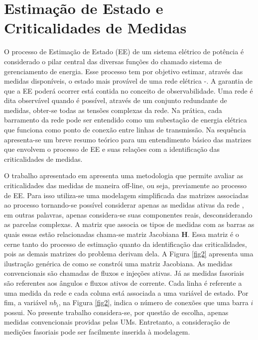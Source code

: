 \documentclass[12pt]{article}
\begin{document}
\section{Estimação de Estado e Criticalidades de Medidas}

O processo de Estimação de Estado (EE) de um sistema elétrico de potência é considerado o pilar central das diversas funções do chamado sistema de gerenciamento de energia. Esse processo tem por objetivo estimar, através das medidas disponíveis, o estado mais provável de uma rede elétrica \cite{Abur04}-\cite{Mont99}. A garantia de que a EE poderá ocorrer está contida no conceito de observabilidade. Uma rede é dita observável quando é possível, através de um conjunto redundante de medidas, obter-se todas as tensões complexas da rede. Na prática, cada barramento da rede pode ser entendido como um subestação de energia elétrica que funciona como ponto de conexão entre linhas de transmissão. Na sequência apresenta-se um breve resumo teórico para um entendimento básico das matrizes que envolvem o processo de EE e suas relações com a identificação das criticalidades de medidas.

O trabalho apresentado em \cite{Hand07} apresenta uma metodologia que permite avaliar as criticalidades das medidas de maneira off-line, ou seja, previamente ao processo de EE. Para isso utiliza-se uma modelagem simplificada das matrizes associadas ao processo tornando-se possível considerar apenas as medidas ativas da rede \cite{Abur04}, em outras palavras, apenas considera-se suas componentes reais, desconsiderando as parcelas complexas. A matriz que associa os tipos de medidas com as barras as quais essas estão relacionadas chama-se matriz Jacobiana $\mathbf{H}$. Essa matriz é o cerne tanto do processo de estimação quanto da identificação das criticalidades, pois as  demais matrizes do problema derivam dela. A Figura \ref{fig2} apresenta uma ilustração genérica de como se constrói uma matriz Jacobiana. As medidas convencionais são chamadas de fluxos e injeções ativas. Já as medidas fasoriais são referentes aos ângulos e fluxos ativos de corrente. Cada linha é referente a uma medida da rede e cada coluna está associada a uma variável de estado. Por fim, a variável $nb_i$, na Figura \ref{fig2}, indica o número de conexões que uma barra $i$ possui. No presente trabalho considera-se, por questão de escolha, apenas medidas convencionais providas pelas UMs. Entretanto, a consideração de medições fasoriais pode ser facilmente inserida à modelagem.
\end{document}
